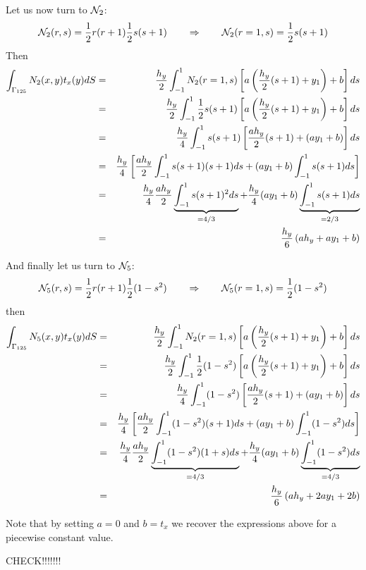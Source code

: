 Let us now turn to ${\mathcal{N}}_2$:
\[
{\mathcal{N}}_2(r,s) = \frac12 r(r+1) \frac12 s(s+1)
\qquad
\Rightarrow
\qquad
{\mathcal{N}}_2(r=1,s) = \frac12 s(s+1)
\]
Then
\begin{eqnarray}
\int_{\Gamma_{125}} N_2(x,y) t_x(y) dS 
&=&\frac{h_y}{2} \int_{-1}^1 N_2(r=1,s) \left[ a \left(\frac{h_y}{2}(s+1) +y_1\right) +b \right] ds \nonumber\\
&=&\frac{h_y}{2} \int_{-1}^1 \frac12 s(s+1) \left[ a \left(\frac{h_y}{2}(s+1) +y_1\right) +b \right] ds \nonumber\\
&=&\frac{h_y}{4} \int_{-1}^1 s(s+1) \left[ \frac{a h_y}{2}(s+1) + (ay_1+b) \right] ds \nonumber\\
&=& \frac{h_y}{4} \left[
\frac{a h_y}{2} \int_{-1}^1 s(s+1) (s+1)  ds 
+(ay_1+b) \int_{-1}^1 s(s+1)   ds 
\right] \nonumber\\
&=& \frac{h_y}{4} 
\frac{a h_y}{2} \underbrace{\int_{-1}^1 s(s+1)^2  ds}_{=4/3} 
+\frac{h_y}{4} (ay_1+b) \underbrace{\int_{-1}^1 s(s+1)  ds}_{=2/3} \nonumber \\
&=& \frac{h_y}{6} \left( a h_y + ay_1+b   \right)
\end{eqnarray}



And finally let us turn to ${\mathcal{N}}_5$:
\[
{\mathcal{N}}_5(r,s) = \frac12 r(r+1) \frac12 (1-s^2)
\qquad
\Rightarrow
\qquad
{\mathcal{N}}_5(r=1,s) = \frac12 (1-s^2)
\]
then
\begin{eqnarray}
\int_{\Gamma_{125}} N_5(x,y) t_x(y) dS 
&=&\frac{h_y}{2} \int_{-1}^1 N_2(r=1,s) \left[ a \left(\frac{h_y}{2}(s+1) +y_1\right) +b \right] ds \nonumber\\
&=&\frac{h_y}{2} \int_{-1}^1 \frac12 (1-s^2) \left[ a \left(\frac{h_y}{2}(s+1) +y_1\right) +b \right] ds \nonumber\\
&=&\frac{h_y}{4} \int_{-1}^1 (1-s^2) \left[ \frac{a h_y}{2}(s+1) + (ay_1+b) \right] ds \nonumber\\
&=& \frac{h_y}{4} \left[
\frac{a h_y}{2} \int_{-1}^1 (1-s^2) (s+1)  ds 
+(ay_1+b) \int_{-1}^1 (1-s^2)   ds 
\right] \nonumber\\
&=& \frac{h_y}{4} 
\frac{a h_y}{2} \underbrace{\int_{-1}^1 (1-s^2)(1+s)  ds}_{=4/3} 
+\frac{h_y}{4} (ay_1+b) \underbrace{\int_{-1}^1 (1-s^2)  ds}_{=4/3} \nonumber \\
&=& \frac{h_y}{6} \left( a h_y + 2ay_1+2 b   \right)
\end{eqnarray}

Note that by setting $a=0$ and $b=t_x$ we recover the expressions above for a 
piecewise constant value.

CHECK!!!!!!!





